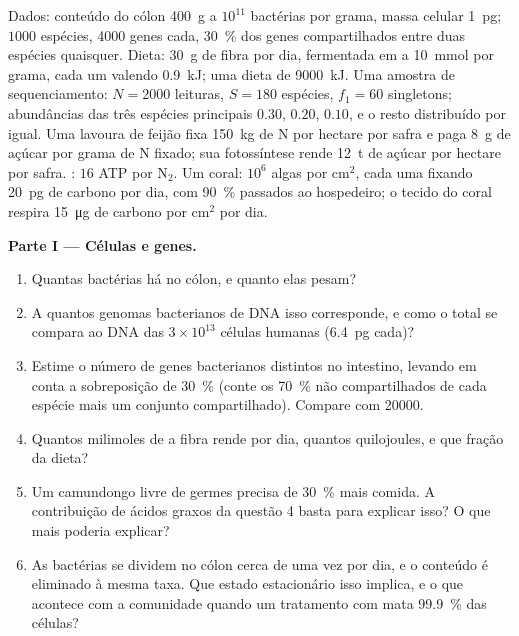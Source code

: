 \begin{problem}
\label{pb:b3:microbiomes:1}
Dados: conteúdo do cólon \qty{400}{g} a $10^{11}$ bactérias por grama,
massa celular \qty{1}{pg}; $1000$ espécies, \num{4000} genes cada,
\qty{30}{\%} dos genes compartilhados entre duas espécies quaisquer.
Dieta: \qty{30}{g} de fibra por dia, fermentada em  a \qty{10}{mmol} por grama, cada um valendo
\qty{0.9}{kJ}; uma dieta de \qty{9000}{kJ}. Uma amostra de
sequenciamento: $N = 2000$ leituras, $S = 180$ espécies, $f_{1} = 60$
singletons; abundâncias das três espécies principais $0.30$, $0.20$,
$0.10$, e o resto distribuído por igual. Uma lavoura de feijão fixa
\qty{150}{kg} de N por hectare por safra e paga \qty{8}{g} de açúcar
por grama de N fixado; sua fotossíntese rende \qty{12}{t} de açúcar por
hectare por safra. : $16$ ATP por N$_{2}$. Um coral:
$10^{6}$ algas por cm$^{2}$, cada uma fixando \qty{20}{pg} de carbono
por dia, com \qty{90}{\%} passados ao hospedeiro; o tecido do coral
respira \qty{15}{\micro g} de carbono por cm$^{2}$ por dia.

\medskip
\noindent\textbf{Parte I --- Células e genes.}
\begin{enumerate}
  \item Quantas bactérias há no cólon, e quanto elas pesam?
  \item A quantos genomas bacterianos de DNA isso corresponde, e como o
        total se compara ao DNA das $3\times 10^{13}$ células humanas
        (\qty{6.4}{pg} cada)?
  \item Estime o número de genes bacterianos distintos no intestino,
        levando em conta a sobreposição de \qty{30}{\%} (conte os
        \qty{70}{\%} não compartilhados de cada espécie mais um
        conjunto compartilhado). Compare com \num{20000}.
  \item Quantos milimoles de  a fibra rende
        por dia, quantos quilojoules, e que fração da dieta?
  \item Um camundongo livre de germes precisa de \qty{30}{\%} mais
        comida. A contribuição de ácidos graxos da questão 4 basta para
        explicar isso? O que mais poderia explicar?
  \item As bactérias se dividem no cólon cerca de uma vez por dia, e o
        conteúdo é eliminado à mesma taxa. Que estado estacionário isso
        implica, e o que acontece com a comunidade quando um tratamento
        com  mata \qty{99.9}{\%} das células?
\end{enumerate}


\end{problem}
